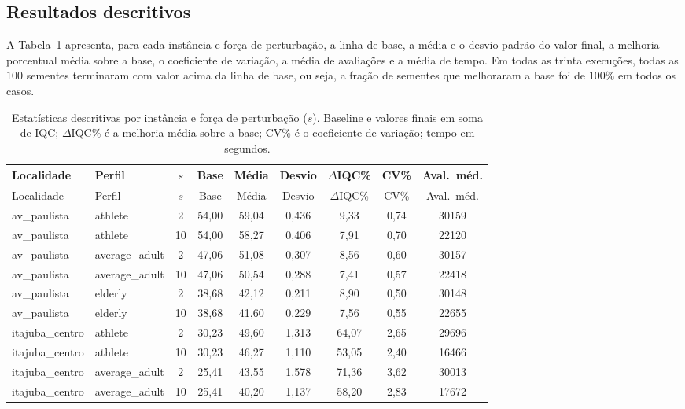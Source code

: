 \documentclass[11pt,a4paper]{article}
\begin{document}
\subsection{Resultados descritivos}

A Tabela~\ref{tab:desc} apresenta, para cada instância e força de perturbação, a linha de base, a média e o desvio padrão do valor final, a melhoria porcentual média sobre a base, o coeficiente de variação, a média de avaliações e a média de tempo. Em todas as trinta execuções, todas as $100$ sementes terminaram com valor acima da linha de base, ou seja, a fração de sementes que melhoraram a base foi de $100\%$ em todos os casos.

\renewcommand{\arraystretch}{1.15}
\begin{longtable}{@{}l l c c c c c c c@{}}
\caption{Estatísticas descritivas por instância e força de perturbação ($s$). Baseline e valores finais em soma de IQC; $\Delta$IQC\% é a melhoria média sobre a base; CV\% é o coeficiente de variação; tempo em segundos.}\label{tab:desc}\\
\toprule
Localidade & Perfil & $s$ & Base & Média & Desvio & $\Delta$IQC\% & CV\% & Aval.\ méd. \\
\midrule
\endfirsthead
\toprule
Localidade & Perfil & $s$ & Base & Média & Desvio & $\Delta$IQC\% & CV\% & Aval.\ méd. \\
\midrule
\endhead
av\_paulista & athlete & 2 & 54,00 & 59,04 & 0,436 & 9,33 & 0,74 & 30159 \\
av\_paulista & athlete & 10 & 54,00 & 58,27 & 0,406 & 7,91 & 0,70 & 22120 \\
av\_paulista & average\_adult & 2 & 47,06 & 51,08 & 0,307 & 8,56 & 0,60 & 30157 \\
av\_paulista & average\_adult & 10 & 47,06 & 50,54 & 0,288 & 7,41 & 0,57 & 22418 \\
av\_paulista & elderly & 2 & 38,68 & 42,12 & 0,211 & 8,90 & 0,50 & 30148 \\
av\_paulista & elderly & 10 & 38,68 & 41,60 & 0,229 & 7,56 & 0,55 & 22655 \\
itajuba\_centro & athlete & 2 & 30,23 & 49,60 & 1,313 & 64,07 & 2,65 & 29696 \\
itajuba\_centro & athlete & 10 & 30,23 & 46,27 & 1,110 & 53,05 & 2,40 & 16466 \\
itajuba\_centro & average\_adult & 2 & 25,41 & 43,55 & 1,578 & 71,36 & 3,62 & 30013 \\
itajuba\_centro & average\_adult & 10 & 25,41 & 40,20 & 1,137 & 58,20 & 2,83 & 17672 \\

\end{longtable}
\end{document}
